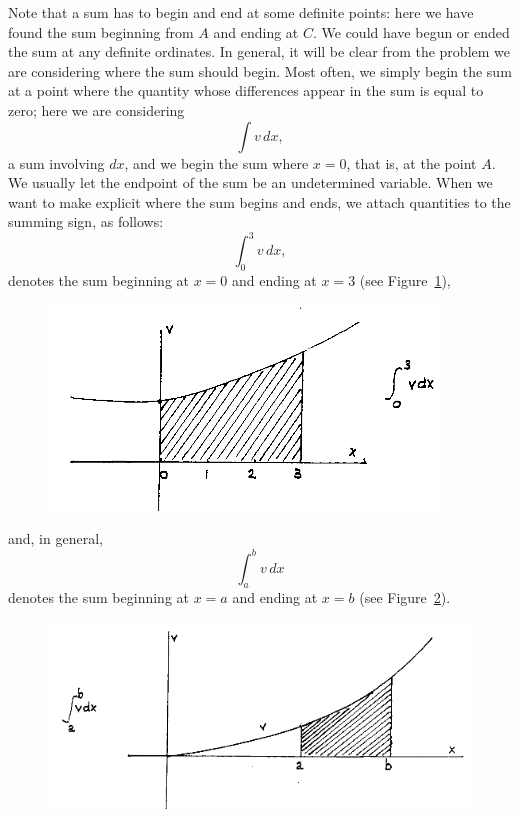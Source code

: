 \documentclass[polutonikogreek,english,twoside,openright]{article}
\begin{document}
Note that a sum has to begin and end at some definite points: here we
have found the sum beginning from $A$ and ending at $C$.  We could
have begun or ended the sum at any definite ordinates.  In general, it
will be clear from the problem we are considering where the sum should
begin. Most often, we simply begin the sum at a point where the
quantity whose differences appear in the sum is equal to zero; here we
are considering
$$\int\! v\,dx,$$
a sum involving $dx$, and we begin the sum where $x=0$, that is, at
the point $A$.  We usually let the endpoint of the sum be an
undetermined variable.  When we want to make explicit where the sum
begins and ends, we attach quantities to the summing sign, as follows:
$$\int^3_0\!v\,dx,$$
denotes the sum beginning at $x=0$ and ending at $x=3$ (see Figure~\ref{sum03}),
\begin{figure}[htp]
\begin{center}
\includegraphics[width=\textwidth]{fig/Figure36B}
\caption{}
\label{sum03}
\vspace{-10pt}
\end{center}
\end{figure} 
and, in general,
$$\int^b_a\!v\,dx$$
denotes the sum beginning at $x=a$ and ending at $x=b$ (see Figure~\ref{sumab}).
\begin{figure}[htp]
\begin{center}
\includegraphics[width=\textwidth]{fig/Figure36C}
\caption{}
\label{sumab}
\vspace{-10pt}
\end{center}
\end{figure} 
\end{document}
